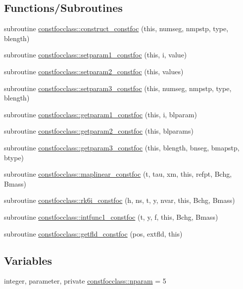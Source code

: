 \subsection*{Functions/\+Subroutines}
\begin{DoxyCompactItemize}
\item 
subroutine \mbox{\hyperlink{namespaceconstfocclass_a36197970c1524c85aeaea51d39f0ede7}{constfocclass\+::construct\+\_\+constfoc}} (this, numseg, nmpstp, type, blength)
\item 
subroutine \mbox{\hyperlink{namespaceconstfocclass_a14001bee7b5f9c4138d8042dcc94955c}{constfocclass\+::setparam1\+\_\+constfoc}} (this, i, value)
\item 
subroutine \mbox{\hyperlink{namespaceconstfocclass_a36ac221c9fb8e90f23b97b10cc272775}{constfocclass\+::setparam2\+\_\+constfoc}} (this, values)
\item 
subroutine \mbox{\hyperlink{namespaceconstfocclass_a9d02ddbf03689cdd653805ca5a56856e}{constfocclass\+::setparam3\+\_\+constfoc}} (this, numseg, nmpstp, type, blength)
\item 
subroutine \mbox{\hyperlink{namespaceconstfocclass_ab906b8830f5fb2cec09297d5004494e9}{constfocclass\+::getparam1\+\_\+constfoc}} (this, i, blparam)
\item 
subroutine \mbox{\hyperlink{namespaceconstfocclass_a59ea6cb7198ad0bf8446abe6978a9069}{constfocclass\+::getparam2\+\_\+constfoc}} (this, blparams)
\item 
subroutine \mbox{\hyperlink{namespaceconstfocclass_ae1fe9fc46cca742a797c388465086489}{constfocclass\+::getparam3\+\_\+constfoc}} (this, blength, bnseg, bmapstp, btype)
\item 
subroutine \mbox{\hyperlink{namespaceconstfocclass_af393c0fed039b82c7eb2aa347bc12bd8}{constfocclass\+::maplinear\+\_\+constfoc}} (t, tau, xm, this, refpt, Bchg, Bmass)
\item 
subroutine \mbox{\hyperlink{namespaceconstfocclass_a25aa498c0852e2952880172b61f0f034}{constfocclass\+::rk6i\+\_\+constfoc}} (h, ns, t, y, nvar, this, Bchg, Bmass)
\item 
subroutine \mbox{\hyperlink{namespaceconstfocclass_a6cedac4005af8166900c4d4b1afd707b}{constfocclass\+::intfunc1\+\_\+constfoc}} (t, y, f, this, Bchg, Bmass)
\item 
subroutine \mbox{\hyperlink{namespaceconstfocclass_a34425bf98b4a4cff016108f25a629dff}{constfocclass\+::getfld\+\_\+constfoc}} (pos, extfld, this)
\end{DoxyCompactItemize}
\subsection*{Variables}
\begin{DoxyCompactItemize}
\item 
integer, parameter, private \mbox{\hyperlink{namespaceconstfocclass_a4a04b85ebc26340b40e7c38cfad62bc1}{constfocclass\+::nparam}} = 5
\end{DoxyCompactItemize}


